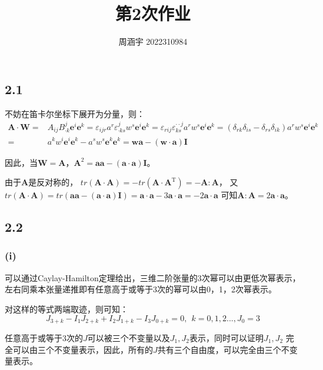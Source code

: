 \documentclass[UTF8,zihao=5]{ctexart}
\title{{\bfseries 第2次作业}}
\author{周涵宇 2022310984}
\date{}
\newcommand{\bm}[1]{{\mathbf{#1}}}
\newcommand{\trans}[0]{^\mathrm{T}}
\begin{document}
\maketitle

\subsection*{2.1}

不妨在笛卡尔坐标下展开为分量，则：
\begin{equation}
    \begin{aligned}
        \bm{A}\cdot\bm{W}= & A_{ij}B^j_{\cdot k}\bm{e}^i\bm{e}^k
        =\varepsilon_{ijr}a^r\varepsilon^j_{\cdot ks}w^s\bm{e}^i\bm{e}^k
        =\varepsilon_{rij}\varepsilon^{\cdot\cdot j}_{ks}a^rw^s\bm{e}^i\bm{e}^k
        =(\delta_{rk}\delta_{is} - \delta_{rs}\delta_{ik})a^rw^s\bm{e}^i\bm{e}^k \\
        =                  & a^kw^i\bm{e}^i\bm{e}^k-a^sw^s\bm{e}^k\bm{e}^k
        =\bm{w}\bm{a}-(\bm{w}\cdot\bm{a})\bm{I}
    \end{aligned}
\end{equation}

因此，当$\bm{W}=\bm{A}$，$\bm{A}^2=\bm{a}\bm{a}-(\bm{a}\cdot\bm{a})\bm{I}$。

由于$\bm{A}$是反对称的，
$tr(\bm{A}\cdot\bm{A}) = -tr(\bm{A}\cdot\bm{A}\trans)=-\bm{A}:\bm{A} $，
又$tr(\bm{A}\cdot\bm{A})=tr(\bm{a}\bm{a}-(\bm{a}\cdot\bm{a})\bm{I})=\bm{a}\cdot\bm{a}-3\bm{a}\cdot\bm{a}=-2\bm{a}\cdot\bm{a}$
可知$\bm{A}:\bm{A}=2\bm{a}\cdot\bm{a}$。

\subsection*{2.2}
\subsubsection*{(i)}
可以通过Caylay-Hamilton定理给出，三维二阶张量的3次幂可以由更低次幂表示，
左右同乘本张量递推即有任意高于或等于3次的幂可以由0，1，2次幂表示。



对这样的等式两端取迹，则可知：
\begin{equation}
    J_{3+k}-I_1J_{2+k}+I_2J_{1+k}-I_3J_{0+k}=0,\ \  k=0,1,2..., J_0=3
\end{equation}

任意高于或等于3次的$J$可以被三个不变量以及$J_1,J_2$表示，同时可以证明$J_1,J_2$
完全可以由三个不变量表示，因此，所有的$J$共有三个自由度，可以完全由三个不变量表示。
\end{document}
